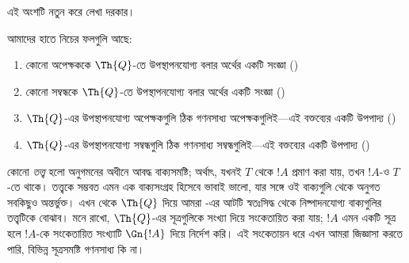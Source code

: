 \documentclass[../../../include/open-logic-section]{subfiles}
\begin{document}


\begin{editorial}
এই অংশটি নতুন করে লেখা দরকার।
\end{editorial}

আমাদের হাতে নিচের ফলগুলি আছে:
\begin{enumerate}
\item কোনো অপেক্ষককে $\Th{Q}$-তে উপস্থাপনযোগ্য বলার অর্থের একটি সংজ্ঞা
  ()
\item কোনো সম্বন্ধকে $\Th{Q}$-তে উপস্থাপনযোগ্য বলার অর্থের একটি সংজ্ঞা
  ()
\item $\Th{Q}$-এর উপস্থাপনযোগ্য অপেক্ষকগুলি ঠিক গণনসাধ্য অপেক্ষকগুলিই---এই
  বক্তব্যের একটি উপপাদ্য
  ()
\item $\Th{Q}$-এর উপস্থাপনযোগ্য সম্বন্ধগুলি ঠিক গণনসাধ্য সম্বন্ধগুলিই---এই
  বক্তব্যের একটি উপপাদ্য
  ()
\end{enumerate}

কোনো \emph{তত্ত্ব} হলো অনুগমনের অধীনে আবদ্ধ বাক্যসমষ্টি; অর্থাৎ, যখনই
$T$ থেকে $!A$ প্রমাণ করা যায়, তখন $!A$-ও $T$-তে থাকে। তত্ত্বকে সম্ভবত
এমন এক বাক্যসংগ্রহ হিসেবে ভাবাই ভালো, যার সঙ্গে ওই বাক্যগুলি থেকে অনুগত
সবকিছুও অন্তর্ভুক্ত। এখন থেকে $\Th{Q}$ দিয়ে আমরা
-এর আটটি স্বতঃসিদ্ধ থেকে নিষ্পাদনযোগ্য বাক্যগুলির
তত্ত্বটিকে বোঝাব। মনে রাখো, $\Th{Q}$-এর সূত্রগুলিকে সংখ্যা দিয়ে
সংকেতায়িত করা যায়; $!A$ এমন একটি সূত্র হলে $!A$-কে সংকেতায়িত সংখ্যাটি
$\Gn{!A}$ দিয়ে নির্দেশ করি। এই সংকেতায়ন ধরে এখন আমরা জিজ্ঞাসা করতে পারি,
বিভিন্ন সূত্রসমষ্টি গণনসাধ্য কি না।
\end{document}
